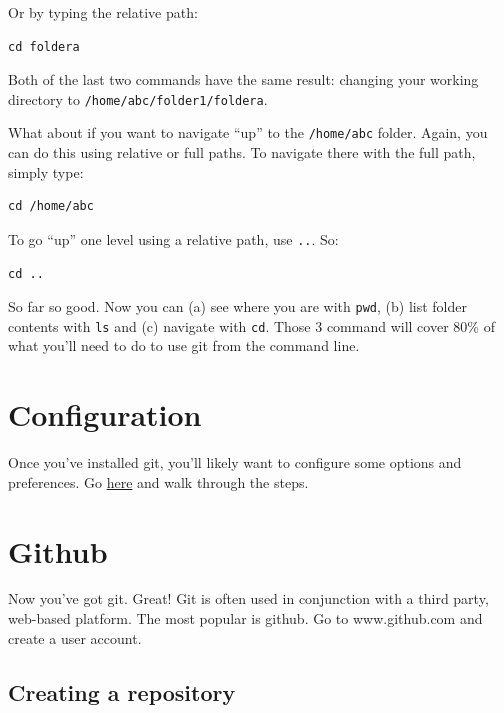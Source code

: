 \documentclass[
]{book}
\begin{document}
Or by typing the relative path:

\begin{verbatim}
cd foldera
\end{verbatim}

Both of the last two commands have the same result: changing your working directory to \texttt{/home/abc/folder1/foldera}.

What about if you want to navigate ``up'' to the \texttt{/home/abc} folder. Again, you can do this using relative or full paths. To navigate there with the full path, simply type:

\begin{verbatim}
cd /home/abc
\end{verbatim}

To go ``up'' one level using a relative path, use \texttt{..}. So:

\begin{verbatim}
cd ..
\end{verbatim}

So far so good. Now you can (a) see where you are with \texttt{pwd}, (b) list folder contents with \texttt{ls} and (c) navigate with \texttt{cd}. Those 3 command will cover 80\% of what you'll need to do to use git from the command line.

\hypertarget{configuration}{%
\section*{Configuration}\label{configuration}}

Once you've installed git, you'll likely want to configure some options and preferences. Go \href{https://git-scm.com/book/en/v2/Getting-Started-First-Time-Git-Setup}{here} and walk through the steps.

\hypertarget{github}{%
\section*{Github}\label{github}}

Now you've got git. Great! Git is often used in conjunction with a third party, web-based platform. The most popular is github. Go to www.github.com and create a user account.

\hypertarget{creating-a-repository}{%
\subsection*{Creating a repository}\label{creating-a-repository}}
\end{document}
